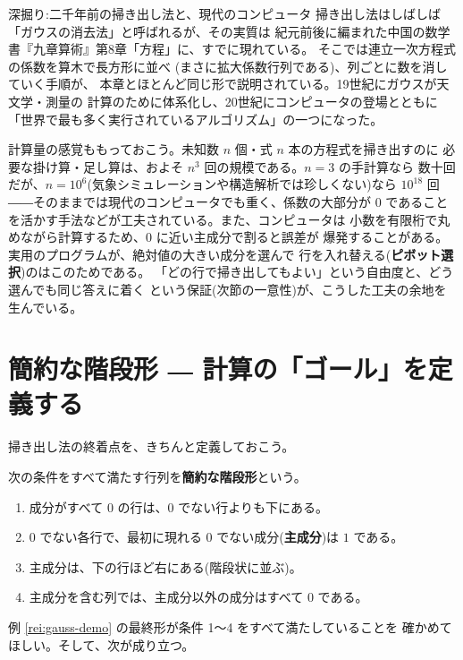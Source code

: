 \begin{itembox}[l]{深掘り:二千年前の掃き出し法と、現代のコンピュータ}
掃き出し法はしばしば「ガウスの消去法」と呼ばれるが、その実質は
紀元前後に編まれた中国の数学書『九章算術』第8章「方程」に、すでに現れている。
そこでは連立一次方程式の係数を算木で長方形に並べ
(まさに拡大係数行列である)、列ごとに数を消していく手順が、
本章とほとんど同じ形で説明されている。19世紀にガウスが天文学・測量の
計算のために体系化し、20世紀にコンピュータの登場とともに
「世界で最も多く実行されているアルゴリズム」の一つになった。

計算量の感覚ももっておこう。未知数 $n$ 個・式 $n$ 本の方程式を掃き出すのに
必要な掛け算・足し算は、およそ $n^3$ 回の規模である。$n = 3$ の手計算なら
数十回だが、$n = 10^6$(気象シミュレーションや構造解析では珍しくない)なら
$10^{18}$ 回――そのままでは現代のコンピュータでも重く、係数の大部分が
$0$ であることを活かす手法などが工夫されている。また、コンピュータは
小数を有限桁で丸めながら計算するため、$0$ に近い主成分で割ると誤差が
爆発することがある。実用のプログラムが、絶対値の大きい成分を選んで
行を入れ替える(\textbf{ピボット選択})のはこのためである。
「どの行で掃き出してもよい」という自由度と、どう選んでも同じ答えに着く
という保証(次節の一意性)が、こうした工夫の余地を生んでいる。
\end{itembox}

\section{簡約な階段形 ― 計算の「ゴール」を定義する}

掃き出し法の終着点を、きちんと定義しておこう。

\begin{teigi}[簡約な階段形]\label{def:rref}
次の条件をすべて満たす行列を\textbf{簡約な階段形}という。
\begin{enumerate}
\item 成分がすべて $0$ の行は、$0$ でない行よりも下にある。
\item $0$ でない各行で、最初に現れる $0$ でない成分(\textbf{主成分})は
$1$ である。
\item 主成分は、下の行ほど右にある(階段状に並ぶ)。
\item 主成分を含む列では、主成分以外の成分はすべて $0$ である。
\end{enumerate}
\end{teigi}

例 \ref{rei:gauss-demo} の最終形が条件 1〜4 をすべて満たしていることを
確かめてほしい。そして、次が成り立つ。

